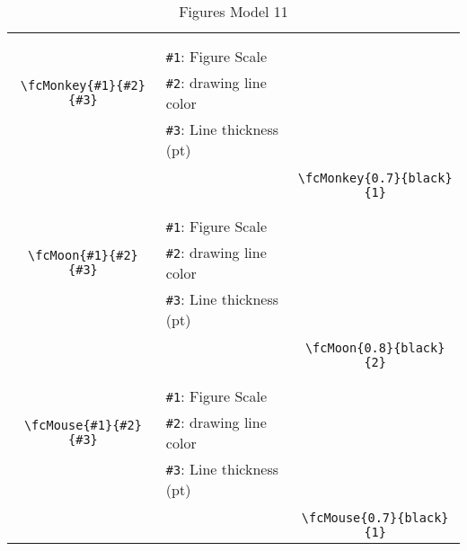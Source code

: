 \documentclass[x11names]{article}
\begin{document}
\begin{table}[H]
\begin{tabular}{|c|l|c|}
	&&\multirow{5}{*}{\fcMonkey{0.7}{black}{1}}\\	&&\\	&\verb|#1|: Figure Scale &\\	\verb|\fcMonkey{#1}{#2}{#3}|&	\verb|#2|: drawing line color &\\	&\verb|#3|: Line thickness (pt) &\\ &&\\&&	\verb|\fcMonkey{0.7}{black}{1}|\\\hline 	
	&&\multirow{5}{*}{\fcMoon{0.8}{black}{2}}\\	&&\\	&\verb|#1|: Figure Scale &\\	\verb|\fcMoon{#1}{#2}{#3}|&	\verb|#2|: drawing line color &\\	&\verb|#3|: Line thickness (pt) &\\ &&\\&&	\verb|\fcMoon{0.8}{black}{2}|\\\hline 	
	&&\multirow{5}{*}{\fcMouse{0.7}{black}{1}}\\	&&\\	&\verb|#1|: Figure Scale &\\	\verb|\fcMouse{#1}{#2}{#3}|&	\verb|#2|: drawing line color &\\	&\verb|#3|: Line thickness (pt) &\\ &&\\&&	\verb|\fcMouse{0.7}{black}{1}|\\\hline 	\hline\end{tabular}\caption{Figures Model 11}\label{tab11}\end{table}
\end{document}

